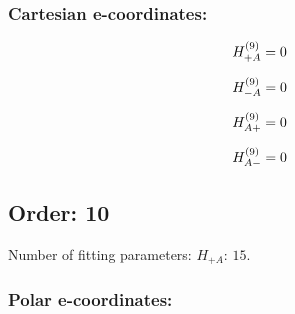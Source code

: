 \documentclass[fleqn]{article}
\begin{document}
\subsubsection*{Cartesian e-coordinates:}

\begin{dmath*}
H_{+A}^{(9)}=0\\
\end{dmath*}

\begin{dmath*}
H_{-A}^{(9)}=0\\
\end{dmath*}

\begin{dmath*}
H_{A+}^{(9)}=0\\
\end{dmath*}

\begin{dmath*}
H_{A-}^{(9)}=0\\
\end{dmath*}
\subsection{Order: 10}
Number of fitting parameters: $H_{+A}$: $15$.
\subsubsection*{Polar e-coordinates:}
\end{document}
